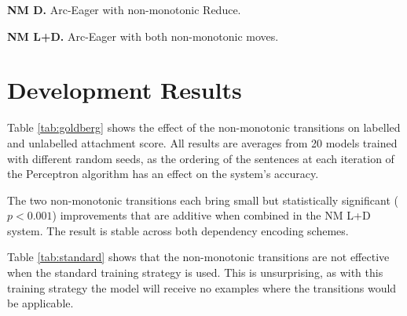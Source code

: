 \documentclass[11pt,letterpaper]{article}
\begin{document}
\noindent\textbf{NM D.} Arc-Eager with non-monotonic Reduce.

\noindent\textbf{NM L+D.} Arc-Eager with both non-monotonic moves.

\section{Development Results}
\label{sec:results}

Table \ref{tab:goldberg} shows the effect of the non-monotonic transitions on
labelled and unlabelled attachment score. All results are averages from 20 models
trained with different random seeds, as the ordering of the sentences at each iteration
of the Perceptron algorithm has an effect on the system's accuracy.

The two non-monotonic transitions each bring small but statistically significant
($p < 0.001$) improvements that are additive when combined in the NM L+D system.
The result is stable across both dependency encoding schemes.

Table \ref{tab:standard} shows that the non-monotonic transitions are not effective
when the standard training strategy is used. This is unsurprising, as with this
training strategy the model will receive no examples where the transitions would
be applicable.
\end{document}
